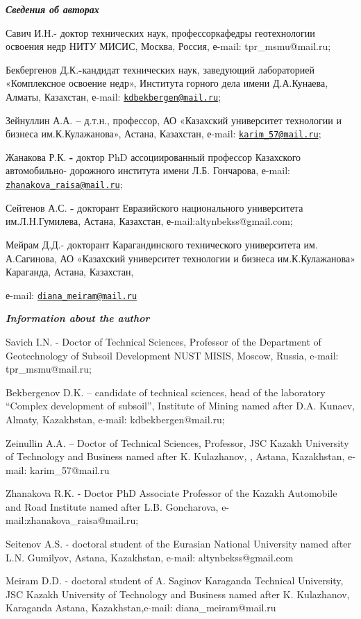 \begin{authorinfo}
\hspace{1em}\emph{{\bfseries Сведения об авторах}}

Савич И.Н.- доктор технических наук, профессоркафедры геотехнологии
освоения недр НИТУ МИСИС, Москва, Россия, е-mail: tpr\_msmu@mail.ru;

Бекбергенов Д.К.{\bfseries -}кандидат технических наук, заведующий
лабораторией «Комплексное освоение недр», Института горного дела имени
Д.А.Кунаева, Алматы, Казахстан, е-mail:
\href{mailto:kdbekbergen@mail.ru}{\nolinkurl{kdbekbergen@mail.ru}};

Зейнуллин А.А. {\bfseries --} д.т.н., профессор, АО «Казахский университет
технологии и бизнеса им.К.Кулажанова», Астана, Казахстан, е-mail:
\href{mailto:karim_57@mail.ru}{\nolinkurl{karim\_57@mail.ru}};

Жанакова Р.К. {\bfseries -} доктор PhD ассоциированный профессор Казахского
автомобильно- дорожного института имени Л.Б. Гончарова, е-mail:
\href{mailto:zhanakova_raisa@mail.ru}{\nolinkurl{zhanakova\_raisa@mail.ru}};

Сейтенов А.С. {\bfseries -} докторант Евразийского национального
университета им.Л.Н.Гумилева, Астана, Казахстан, е-mail:altynbekss@gmail.com;

Мейрам Д.Д.- докторант Карагандинского технического университета им.
А.Сагинова, АО «Казахский университет технологии и бизнеса
им.К.Кулажанова» Караганда, Астана, Казахстан,

е-mail:
\href{mailto:diana_meiram@mail.ru}{\nolinkurl{diana\_meiram@mail.ru}}

\hspace{1em}\emph{{\bfseries Information about the author}}

Savich I.N. - Doctor of Technical Sciences, Professor of the Department
of Geotechnology of Subsoil Development NUST MISIS, Moscow, Russia,
e-mail: tpr\_msmu@mail.ru;

Bekbergenov D.K. -- candidate of technical sciences, head of the
laboratory ``Complex development of subsoil'', Institute of Mining named
after D.A. Kunaev, Almaty, Kazakhstan, e-mail: kdbekbergen@mail.ru;

Zeinullin A.A. -- Doctor of Technical Sciences, Professor, JSC Kazakh
University of Technology and Business named after K. Kulazhanov, ,
Astana, Kazakhstan, e-mail: karim\_57@mail.ru

Zhanakova R.K. - Doctor PhD Associate Professor of the Kazakh Automobile
and Road Institute named after L.B. Goncharova, e-mail:zhanakova\_raisa@mail.ru;

Seitenov A.S. - doctoral student of the Eurasian National University
named after L.N. Gumilyov, Astana, Kazakhstan, e-mail: altynbekss@gmail.com

Meiram D.D. - doctoral student of A. Saginov Karaganda Technical
University, JSC Kazakh University of Technology and Business named after
K. Kulazhanov, Karaganda Astana, Kazakhstan,e-mail:
diana\_meiram@mail.ru
\end{authorinfo}
